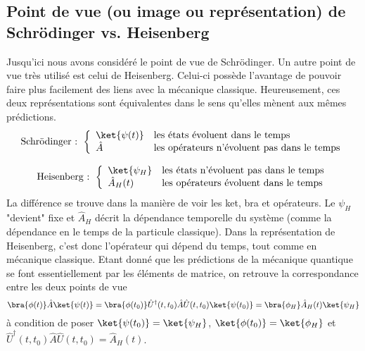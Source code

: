 	\subsection{Point de vue (ou image ou représentation) de Schrödinger vs. Heisenberg}
	Jusqu'ici nous avons considéré le point de vue de Schrödinger.
	Un autre point de vue très utilisé est celui de Heisenberg. Celui-ci possède l'avantage de pouvoir
	faire plus facilement des liens avec la mécanique classique.
	Heureusement, ces deux représentations sont équivalentes dans le sens qu'elles
	mènent aux mêmes prédictions.
	\begin{equation}
	\text{Schrödinger : }\left\{\begin{array}{ll}
	\ket{\psi(t)} & \text{les états évoluent dans le temps}\\
	\hat{A} & \text{les opérateurs n'évoluent pas dans le temps}	
	\end{array}\right.
	\end{equation}
	
	\begin{equation}
	\text{Heisenberg : }\left\{\begin{array}{ll}
	\ket{\psi_H} & \text{les états n'évoluent pas dans le temps}\\
	\hat{A}_H(t) & \text{les opérateurs évoluent dans le temps}	
	\end{array}\right.
	\end{equation}	
	La différence se trouve dans la manière de voir les ket, bra et opérateurs.
	Le $\psi_H$ "devient" fixe et $\hat{A}_H$ décrit la dépendance temporelle du système
	(comme la dépendance en le temps de la particule classique). Dans la représentation
	de Heisenberg, c'est donc l'opérateur qui dépend du temps, tout comme en mécanique 
	classique. Etant donné que les prédictions de la mécanique quantique se font
	essentiellement par les éléments de matrice, on retrouve la correspondance entre les
	deux points de vue
	\begin{equation}
	\bra{\phi(t)}\hat{A}\ket{\psi(t)} = \bra{\phi(t_0)}\hat{U}^\dagger(t,t_0)\hat{A}\hat{U}(t,t_0)\ket{\psi(t_0)} 
	= \bra{\phi_H}\hat{A}_H(t)\ket{\psi_H}
	\end{equation}
	à condition de poser $\ket{\psi(t_0)} = \ket{\psi_H}$, $\ket{\phi(t_0)} = \ket{\phi_H}$ et
	 $\hat{U}^\dagger(t,t_0)\hat{A}\hat{U}(t,t_0) = \hat{A}_H(t)$.
	
 

